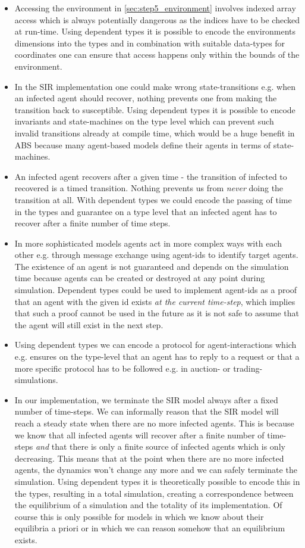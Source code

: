 \begin{itemize}
	\item Accessing the environment in \ref{sec:step5_environment} involves indexed array access which is always potentially dangerous as the indices have to be checked at run-time. Using dependent types it is possible to encode the environments dimensions into the types and in combination with suitable data-types for coordinates one can ensure that access happens only within the bounds of the environment.
	\item In the SIR implementation one could make wrong state-transitions e.g. when an infected agent should recover, nothing prevents one from making the transition back to susceptible. Using dependent types it is possible to encode invariants and state-machines on the type level which can prevent such invalid transitions already at compile time, which would be a huge benefit in ABS because many agent-based models define their agents in terms of state-machines.
	\item An infected agent recovers after a given time - the transition of infected to recovered is a timed transition. Nothing prevents us from \textit{never} doing the transition at all. With dependent types we could encode the passing of time in the types and guarantee on a type level that an infected agent has to recover after a finite number of time steps.
	\item In more sophisticated models agents act in more complex ways with each other e.g. through message exchange using agent-ids to identify target agents. The existence of an agent is not guaranteed and depends on the simulation time because agents can be created or destroyed at any point during simulation. Dependent types could be used to implement agent-ids as a proof that an agent with the given id exists \textit{at the current time-step}, which implies that such a proof cannot be used in the future as it is not safe to assume that the agent will still exist in the next step.
	\item Using dependent types we can encode a protocol for agent-interactions which e.g. ensures on the type-level that an agent has to reply to a request or that a more specific protocol has to be followed e.g. in auction- or trading-simulations.
	\item In our implementation, we terminate the SIR model always after a fixed number of time-steps. We can informally reason that the SIR model will reach a steady state when there are no more infected agents. This is because we know that all infected agents will recover after a finite number of time-steps \textit{and} that there is only a finite source of infected agents which is only decreasing. This means that at the point when there are no more infected agents, the dynamics won't change any more and we can safely terminate the simulation. Using dependent types it is theoretically possible to encode this in the types, resulting in a total simulation, creating a correspondence between the equilibrium of a simulation and the totality of its implementation. Of course this is only possible for models in which we know about their equilibria a priori or in which we can reason somehow that an equilibrium exists.
\end{itemize}